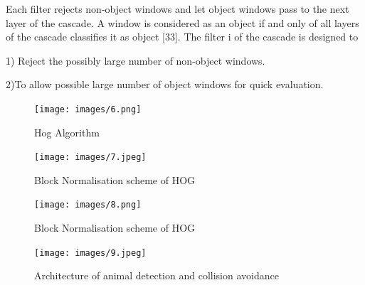 \documentclass[14pt,a4paper,final]{extreport}
\begin{document}
\item Each filter rejects non-object windows and let object windows pass to the next layer of the cascade. A window is considered as an object if and only of all layers of the cascade classifies it as object [33]. The filter i of the cascade is designed to

\item 1) Reject the possibly large number of non-object windows.

\item 2)To allow possible large number of object windows for quick evaluation.
\newline
\newline

\begin{figure}[h]
	\begin{center}
		\texttt{[image: images/6.png]}
		\vspace{.1 cm}
		\caption[Hog Algorithm]{Hog Algorithm}
	\end{center}
\end{figure}
\begin{figure}[h]
	\begin{center}
		\texttt{[image: images/7.jpeg]}
		\vspace{.1 cm}
		\caption [Block Normalisation scheme of HOG]{Block Normalisation scheme of HOG}
	\end{center}
\end{figure}
\begin{figure}[h]
	\begin{center}
		\texttt{[image: images/8.png]}
		\vspace{.5cm}
		\caption [Block Normalisation scheme of HOG]{Block Normalisation scheme of HOG}
	\end{center}
\end{figure}
\begin{figure}[h]
	\begin{center}
		\texttt{[image: images/9.jpeg]}
		\caption [Architecture of animal detection and collision avoidance]{Architecture of animal detection and collision avoidance}
	\end{center}
\end{figure}
\end{document}
